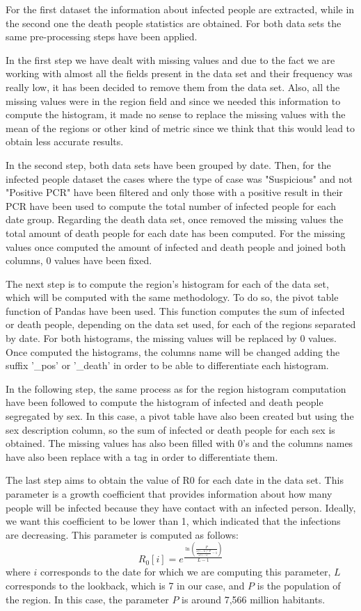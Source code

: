 \documentclass[anon]{CI}
\begin{document}
For the first dataset the information about infected people are extracted, while in the second one the death people statistics are obtained. For both data sets the same pre-processing steps have been applied.

In the first step we have dealt with missing values and due to the fact we are working with almost all the fields present in the data set and their frequency was really low, it has been decided to remove them from the data set. Also, all the missing values were in the region field and since we needed this information to compute the histogram, it made no sense to replace the missing values with the mean of the regions or other kind of metric since we think that this would lead to obtain less accurate results.

In the second step, both data sets have been grouped by date. Then, for the infected people dataset the cases where the type of case was "Suspicious" and not "Positive PCR" have been filtered and only those with a positive result in their PCR have been used to compute the total number of infected people for each date group. Regarding the death data set, once removed the missing values the total amount of death people for each date has been computed. For the missing values once computed the amount of infected and death people and joined both columns, 0 values have been fixed.

The next step is to compute the region's histogram for each of the data set, which will be computed with the same methodology. To do so, the pivot table function of Pandas have been used. This function computes the sum of infected or death people, depending on the data set used, for each of the regions separated by date. For both histograms, the missing values will be replaced by 0 values. Once computed the histograms, the columns name will be changed adding the suffix '\_pos' or '\_death' in order to be able to differentiate each histogram. 

In the following step, the same process as for the region histogram computation have been followed to compute the histogram of infected and death people segregated by sex. In this case, a pivot table have also been created but using the sex description column, so the sum of infected or death people for each sex is obtained. The missing values has also been filled with 0's and the columns names have also been replace with a tag in order to differentiate them.

The last step aims to obtain the value of R0 for each date in the data set. This parameter is a growth coefficient that provides information about how many people will be infected because they have contact with an infected person. Ideally, we want this coefficient to be lower than 1, which indicated that the infections are decreasing. This parameter is computed as follows:
\begin{equation}
    \label{eqn:R0}
    R_0[i] = e^{\frac{\ln (\frac{P}{\frac {x[i-L]*P}{x[i-1]}-1})}{L-1}}
\end{equation}
where $i$ corresponds to the date for which we are computing this parameter, $L$ corresponds to the lookback, which is 7 in our case, and $P$ is the population of the region. In this case, the parameter $P$ is around 7,566 million habitants.
\end{document}
